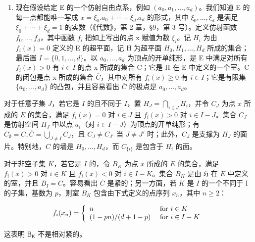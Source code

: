 \begin{enumerate}
\def\labelenumi{\alph{enumi})}
\setcounter{enumi}{1}
\tightlist
\item
  现在假设给定 E 的一个仿射自由点系，例如 \((a_{0}, a_{1}, \ldots, a_{d})\)。我们知道 E 的每一点都能唯一写成 \(x = \xi_{0}.a_{0} + \cdots + \xi_{d}.a_{d}\) 的形式，其中 \(\xi_{0}, \ldots, \xi_{d}\) 是满足 \(\xi_{0} + \cdots + \xi_{d} = 1\) 的实数（《代数》，第 2 章，§9，第 3 号）。定义仿射函数 \(f_{0}, \ldots, f_{d}\)，其中函数 \(f_{i}\) 把如上写出的点 x 赋值为数 \(\xi_{i}\)。记 \(H_{i}\) 为由 \(f_{i}(x) = 0\) 定义的 E 的超平面，记 H 为超平面 \(H_{0}, H_{1}, \ldots, H_{d}\) 所成的集合；最后置 \(I = \{0, 1, \ldots, d\}\)。以 \(a_{0}, \ldots, a_{d}\) 为顶点的开单纯形，是 E 中满足对所有 \(f_{i}(x) > 0\) 有 \(i \in I\) 的点 x 所成的集合 C；它是 H 在 E 中定义的一个室。C 的闭包是点 x 所成的集合 \(\overline{C}\)，其中对所有 \(f_{i}(x) \geqslant 0\) 有 \(i \in I\)；它是有限集 \(\{a_{0}, \ldots, a_{d}\}\) 的凸包，并且容易看出 \(\overline{C}\) 的极点是 \(a_{0}, \ldots, a_{d}\)。
\end{enumerate}

对于任意子集 \(J\)，若它是 \(I\) 的且不同于 \(I\)，置 \(H_J = \bigcap_{i \in J} H_i\)，并令 \(C_J\) 为点 \(x\) 所成的 \(E\) 的集合，满足 \(f_i(x) = 0\) 对 \(i \in J\) 且 \(f_i(x) > 0\) 对 \(i \in I - J\)。集合 \(C_J\) 是仿射空间 \(H_J\) 中以点 \(a_i\)（对 \(i \in I - J\)）为顶点的开单纯形；有 \(C_\emptyset = C, \overline{C} = \bigcup_{J \neq I} C_J\)，且 \(C_J \neq C_{J'}\) 当 \(J \neq J'\) 时；此外，\(C_J\) 是支撑为 \(H_J\) 的面片。特别地，\(C\) 的墙是 \(H_0, \ldots, H_d\)，而 \(C_{\{i\}}\) 是包含于 \(H_i\) 的面。

对于非空子集 \(K\)，若它是 \(I\) 的，令 \(B_K\) 为点 \(x\) 所成的 \(E\) 的集合，满足 \(f_i(x) > 0\) 对 \(i \in K\) 且 \(f_i(x) < 0\) 对 \(i \in I - K\)。集合 \(B_K\) 是由 \(\mathfrak{H}\) 在 \(E\) 中定义的室，并且 \(B_I = C\)。容易看出 \(\overline{C}\) 是紧的；另一方面，若 \(K\) 是 \(I\) 的一个不同于 I 的子集，基数为 \(p\)，则室 \(B_K\) 包含由下式定义的点序列 \(x_n\)，其中 \(n \geqslant 2\)：

\[
f _ {i} (x _ {n}) = \left\{ \begin{array}{l l} n & \text { for } i \in K \\ (1 - p n) / (d + 1 - p) & \text { for } i \in I - K \end{array} \right.
\]

这表明 \(\mathsf{B}_{\mathsf{K}}\) 不是相对紧的。

